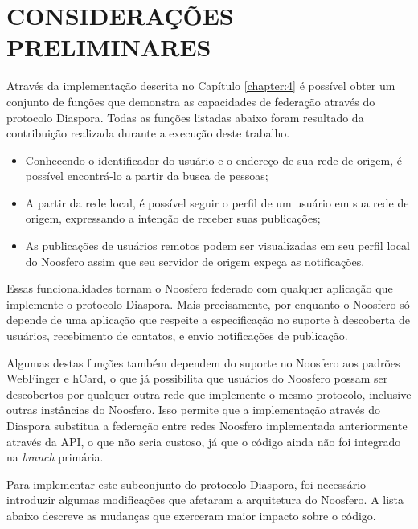 \chapter{CONSIDERAÇÕES PRELIMINARES}
\label{chapter:5}

Através da implementação descrita no Capítulo \ref{chapter:4} é possível obter um
conjunto de funções que demonstra as capacidades de federação através do protocolo
Diaspora. Todas as funções listadas abaixo foram resultado da contribuição realizada
durante a execução deste trabalho.

\begin{itemize}
  \item{Conhecendo o identificador do usuário e o endereço de sua rede de origem, é
        possível encontrá-lo a partir da busca de pessoas;}
  \item{A partir da rede local, é possível seguir o perfil de um usuário em sua rede
        de origem, expressando a intenção de receber suas publicações;}
  \item{As publicações de usuários remotos podem ser visualizadas em seu perfil
        local do Noosfero assim que seu servidor de origem expeça as notificações.}
\end{itemize}

Essas funcionalidades tornam o Noosfero federado com qualquer aplicação que
implemente o protocolo Diaspora. Mais precisamente, por enquanto o Noosfero só
depende de uma aplicação que respeite a especificação no suporte à descoberta de
usuários, recebimento de contatos, e envio notificações de publicação.

Algumas destas funções também dependem do suporte no Noosfero aos padrões WebFinger
e hCard, o que já possibilita que usuários do Noosfero possam ser descobertos por
qualquer outra rede que implemente o mesmo protocolo, inclusive outras instâncias do
Noosfero. Isso permite que a implementação através do Diaspora substitua a federação
entre redes Noosfero implementada anteriormente através da API, o que não seria
custoso, já que o código ainda não foi integrado na \textit{branch} primária.

Para implementar este subconjunto do protocolo Diaspora, foi necessário introduzir
algumas modificações que afetaram a arquitetura do Noosfero. A lista abaixo descreve
as mudanças que exerceram maior impacto sobre o código.

